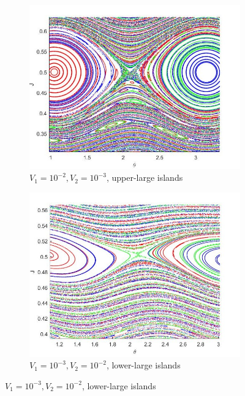 %
\begin{figure}[H]
	\centering
	\begin{subfigure}{.5\textwidth}
  		\includegraphics[scale=0.47,left]{Hamiltonian_1/numerical/figs/Q5_1e-2.1e-3_3634_zoom1}
  		\caption{$V_1=10^{-2},V_2=10^{-3}$, upper-large islands}
  		\label{fig2.7a}
	\end{subfigure}%
	\begin{subfigure}{.5\textwidth}
  		\includegraphics[scale=0.47,right]{Hamiltonian_1/numerical/figs/Q5_1e-3.1e-2_3634_zoom1}
  		\caption{$V_1=10^{-3},V_2=10^{-2}$, lower-large islands}
  		\label{fig2.7b}
	\end{subfigure}

\end{figure}
